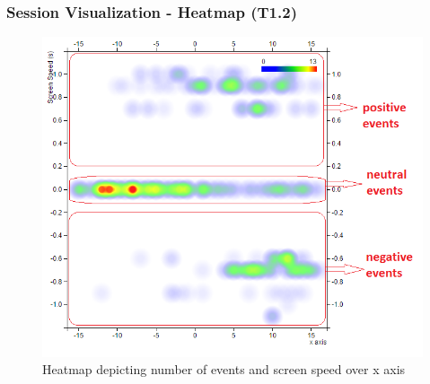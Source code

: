 \documentclass[xcolor=table]{beamer}
\begin{document}
\begin{frame}
\frametitle{Session Visualization - Heatmap (T1.2)}
\begin{figure}
\includegraphics[scale=0.4]{images/heatmap3.png}
\caption{Heatmap depicting number of events and screen speed over x axis}
\end{figure}
\end{frame}
\end{document}
